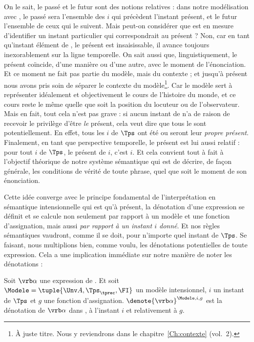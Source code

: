 
On le sait, le passé et le futur sont des notions relatives : dans notre modélisation avec {\Tps}, le passé sera l'ensemble des $i$ qui précèdent l'instant présent, et le futur l'ensemble de ceux qui le suivent. 
Mais peut-on considérer que {\Tps} est en mesure d'identifier un instant particulier qui correspondrait au présent ? Non, car en tant qu'instant élément de {\Tps}, le présent est insaisissable, il avance toujours inexorablement sur la ligne temporelle. On sait aussi que, linguistiquement, le présent coïncide, d'une manière ou d'une autre, avec le moment de l'énonciation.  Et ce moment ne fait pas partie du modèle, mais du contexte ; et jusqu'à présent nous avons pris soin de séparer le contexte du modèle\footnote{À juste titre. Nous y reviendrons dans le chapitre~\ref{Ch:contexte} (vol.~2).}.  Car le modèle sert à représenter idéalement et objectivement le cours de l'histoire du monde, et ce cours reste le même quelle que soit la position du locuteur ou de l'observateur.  
Mais en fait, tout cela n'est pas grave : si aucun instant de {\Tps} n'a de raison de recevoir le privilège d'être \emph{le} présent, cela veut dire que tous le sont potentiellement. En effet, tous les $i$ de $\Tps$ ont été ou seront leur \emph{propre présent}.  Finalement, en tant que perspective temporelle, le présent est lui aussi relatif : pour tout $i$ de $\Tps$, le présent de $i$, c'est $i$.
Et cela convient tout à fait à l'objectif théorique de notre système sémantique qui est de décrire, de façon générale, les conditions de vérité de toute phrase, quel que soit le moment de son énonciation.


Cette idée converge avec le principe fondamental de l'interprétation en sémantique intensionnelle qui est qu'à présent, la dénotation d'une expression se définit et se calcule non seulement par rapport à un modèle et une fonction d'assignation, mais aussi \emph{par rapport à un instant $i$ donné}. Et nos règles sémantiques vaudront, comme il se doit, pour n'importe quel instant de $\Tps$. 
Se faisant, nous multiplions bien, comme voulu, les dénotations potentielles de toute expression.
Cela a une implication immédiate sur notre manière de noter les dénotations :


\begin{nota}
Soit $\vrb\alpha$ une expression de {\LO}.  Et soit $\Modele=\tuple{\Unv A,\Tps_{\tprec},\FI}$ un modèle intensionnel, $i$ un instant de $\Tps$ et $g$ une fonction d'assignation.
\(\denote{\vrb\alpha}^{\Modele,i,g}\) est la dénotation de
$\vrb\alpha$ dans {\Modele}, à l'instant $i$ et relativement à  $g$.
\end{nota}

